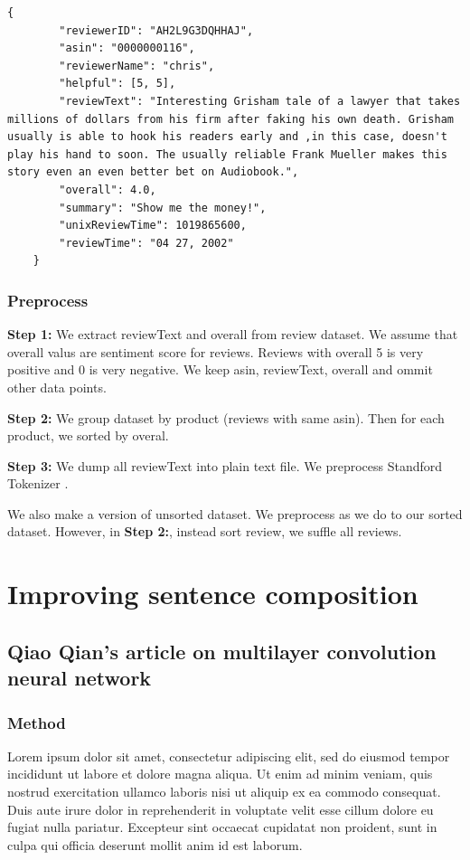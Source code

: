 \begin{lstlisting}[caption={Amazon reviews sample},label={lst:amzreview}]
	{
		"reviewerID": "AH2L9G3DQHHAJ",
		"asin": "0000000116",
		"reviewerName": "chris",
		"helpful": [5, 5],
		"reviewText": "Interesting Grisham tale of a lawyer that takes millions of dollars from his firm after faking his own death. Grisham usually is able to hook his readers early and ,in this case, doesn't play his hand to soon. The usually reliable Frank Mueller makes this story even an even better bet on Audiobook.",
		"overall": 4.0,
		"summary": "Show me the money!",
		"unixReviewTime": 1019865600,
		"reviewTime": "04 27, 2002"
	}
\end{lstlisting}

\subsubsection{Preprocess}
\textbf{Step 1:}
We extract reviewText and overall from review dataset. We assume that overall valus are sentiment score for reviews. Reviews with overall 5 is very positive and 0 is very negative. We keep asin, reviewText, overall and ommit other data points.

\textbf{Step 2:}
We group dataset by product (reviews with same asin). Then for each product, we sorted by overal.

\textbf{Step 3:}
We dump all reviewText into plain text file. We preprocess Standford Tokenizer \cite{tokenizerpart}.

We also make a version of unsorted dataset. We preprocess as we do to our sorted dataset. However, in \textbf{Step 2:}, instead sort review, we suffle all reviews.

\section{Improving sentence composition}
\subsection{Qiao Qian's article on multilayer convolution neural network}
\subsubsection{Method}
Lorem ipsum dolor sit amet, consectetur adipiscing elit, sed do eiusmod tempor incididunt ut labore et dolore magna aliqua. Ut enim ad minim veniam, quis nostrud exercitation ullamco laboris nisi ut aliquip ex ea commodo consequat. Duis aute irure dolor in reprehenderit in voluptate velit esse cillum dolore eu fugiat nulla pariatur. Excepteur sint occaecat cupidatat non proident, sunt in culpa qui officia deserunt mollit anim id est laborum.
